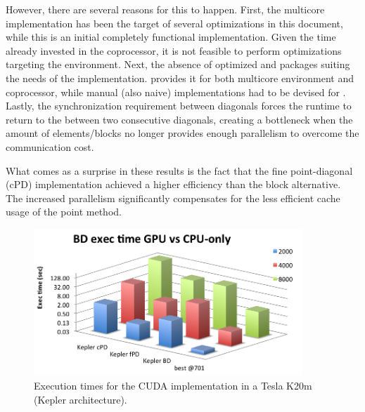 \documentclass[../thesis]{subfiles}
\begin{document}
	However, there are several reasons for this to happen. First, the multicore implementation has been the target of several optimizations in this document, while this is an initial completely functional \cuda implementation. Given the time already invested in the \intel\xeonphi coprocessor, it is not feasible to perform optimizations targeting the \cuda environment. Next, the absence of optimized \blas and \lapack packages suiting the needs of the implementation. \mkl provides it for both multicore environment and coprocessor, while manual (also naive) implementations had to be devised for \cuda. Lastly, the synchronization requirement between diagonals forces the runtime to return to the \cpu between two consecutive diagonals, creating a bottleneck when the amount of elements/blocks no longer provides enough parallelism to overcome the communication cost.

	What comes as a surprise in these results is the fact that the fine point-diagonal (cPD) implementation achieved a higher efficiency than the block alternative. The increased parallelism significantly compensates for the less efficient cache usage of the point method.

	\begin{figure}[t]
		\centering
		\includegraphics[width=0.9\textwidth]{assets/images/cuda/times.png}
		\caption{Execution times for the CUDA implementation in a Tesla K20m (Kepler architecture).}
		\label{fig:cuda:results:times}
	\end{figure}
\end{document}

